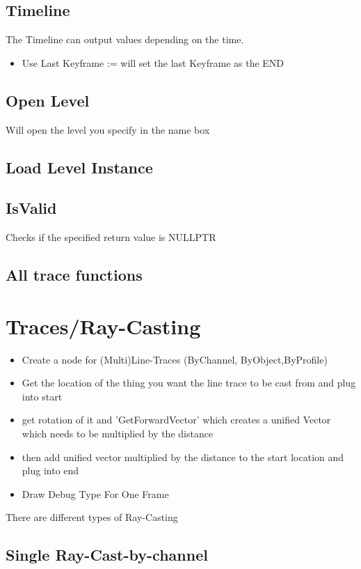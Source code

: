         \subsection{Timeline}
            The Timeline can output values depending on the time.
            \begin{itemize}
                \item Use Last Keyframe := will set the last Keyframe as the END
            \end{itemize}

        \subsection{Open Level}
            Will open the level you specify in the name box \\
        \subsection{Load Level Instance}
        \subsection{IsValid}
            Checks if the specified return value is NULLPTR
        \subsection{All trace functions}
    
    \section{Traces/Ray-Casting}
        \begin{itemize}
            \item Create a node for (Multi)Line-Traces (ByChannel, ByObject,ByProfile)
            \item Get the location of the thing you want the line trace to be cast from and plug into start
            \item get rotation of it and 'GetForwardVector' which creates a unified Vector which needs to be multiplied by the distance
            \item then add unified vector multiplied by the distance to the start location and plug into end
            \item Draw Debug Type For One Frame
        \end{itemize}
        There are different types of Ray-Casting \\
        \subsection{Single Ray-Cast-by-channel}
